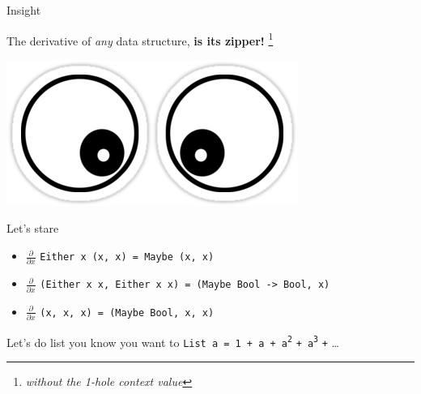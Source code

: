 \begin{frame}
\begin{block}{Insight}
\begin{center}
  The derivative of \emph{any} data structure, \textbf{is its zipper!}\cite{abbott2005data} \footnote{\emph{without the 1-hole context value}}
\end{center}
\end{block}
\end{frame}


\begin{frame}
\begin{center}
\includegraphics[width=0.3\textheight]{image/crosseyed.png}
\end{center}
\begin{block}{Let's stare}
\begin{itemize}
  \item \scriptsize{$\frac{\partial}{\partial x}$ \lstinline{Either x (x, x) = Maybe (x, x)}}
  \item \scriptsize{$\frac{\partial}{\partial x}$ \lstinline{(Either x x, Either x x) = (Maybe Bool -> Bool, x)}}
  \item \scriptsize{$\frac{\partial}{\partial x}$ \lstinline{(x, x, x) = (Maybe Bool, x, x)}}
\end{itemize}
\end{block}
\end{frame}

\begin{frame}
\begin{block}{Let's do list \tiny{you know you want to}}
\lstinline{List a = 1 + a + a}\textsuperscript{\lstinline{2}} \lstinline{+ a}\textsuperscript{\lstinline{3}} \lstinline{+} \ldots
\end{block}
\end{frame}

